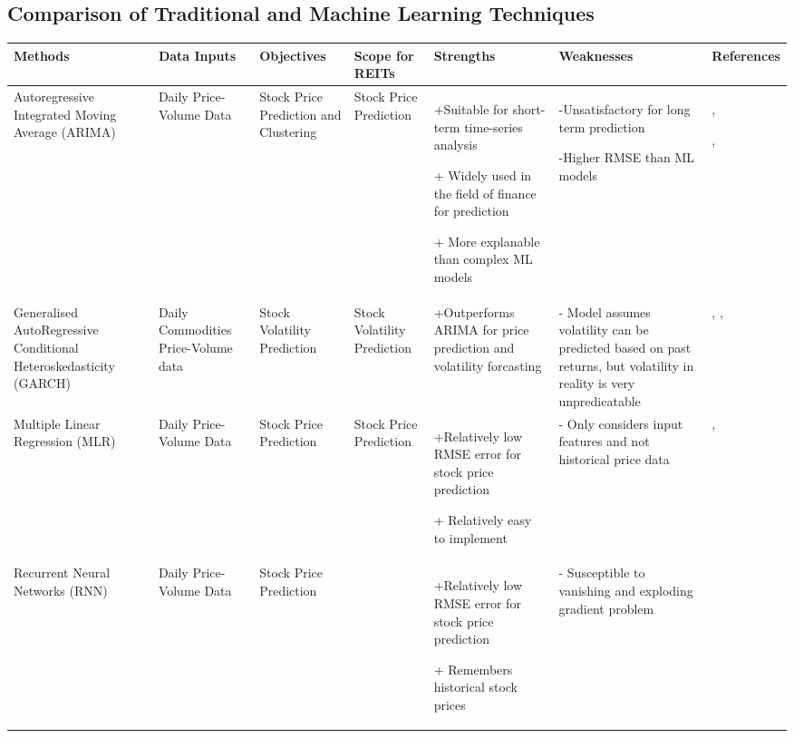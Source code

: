 \documentclass[a4paper,12pt]{report}
\numberwithin{equation}{section}
\theoremstyle{definition}
\begin{document}
\begin{landscape}
  \section{Comparison of Traditional and Machine Learning Techniques}

  \begin{table}[H]
    \begin{adjustwidth}{-1.9cm}{-1.9cm}
    \begin{tabular}{|p{2.6cm}|p{2.7cm}|p{2.7cm}|p{3.5cm}|p{5cm}|p{5cm}|p{4cm}|}
    \hline
    \textbf{Methods} & \textbf{Data Inputs} & \textbf{Objectives} & \textbf{Scope for REITs} & \textbf{Strengths} & \textbf{Weaknesses} & \textbf{References}  
    \\ \hline Autoregressive Integrated Moving Average (ARIMA) & Daily Price-Volume Data & Stock Price Prediction and Clustering & Stock Price Prediction & +Suitable for short-term time-series analysis \par+ Widely used in the field of finance for prediction \par+ More explanable than complex ML models & \par-Unsatisfactory for long term prediction \par-Higher RMSE than ML models   & \cite{ariyo_stock_2014},\par \cite{habbab_machine_2022},\par   \cite{obthong_survey_2020}         
    \\ \hline Generalised AutoRegressive Conditional Heteroskedasticity (GARCH) & Daily Commodities Price-Volume data & Stock Volatility Prediction & Stock Volatility Prediction & +Outperforms ARIMA for price prediction and volatility forcasting & - Model assumes volatility can be predicted based on past returns, but volatility in reality is very unpredicatable & \cite{fiszeder_what_2020},   \cite{lama_modelling_2015}, \cite{yuan_garch_2017}           
    \\ \hline Multiple Linear Regression (MLR) & Daily Price-Volume Data & Stock Price Prediction & Stock Price Prediction & +Relatively low RMSE error for stock price prediction \par+ Relatively easy to implement & - Only considers input features and not historical price data  & \cite{obthong_survey_2020}, \cite{shakhla_stock_2020}
    \\ \hline Recurrent Neural Networks (RNN) & Daily Price-Volume Data & Stock Price Prediction & & +Relatively low RMSE error for stock price prediction\par + Remembers historical stock prices & - Susceptible to vanishing and exploding gradient problem & \cite{dey_comparative_2021} 

\end{tabular}
\end{adjustwidth}
\end{table}
\end{landscape}
\end{document}
